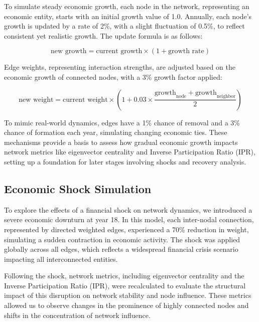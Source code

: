 \documentclass{article} %
\begin{document}
To simulate steady economic growth, each node in the network, representing an economic entity, starts with an initial growth value of 1.0. Annually, each node’s growth is updated by a rate of 2\%, with a slight fluctuation of 0.5\%, to reflect consistent yet realistic growth. The update formula is as follows:

\begin{equation}
\text{new growth} = \text{current growth} \times (1 + \text{growth rate})
\end{equation}

Edge weights, representing interaction strengths, are adjusted based on the economic growth of connected nodes, with a 3\% growth factor applied:

\begin{equation}
\text{new weight} = \text{current weight} \times \left(1 + 0.03 \times \frac{\text{growth}_{\text{node}} + \text{growth}_{\text{neighbor}}}{2}\right)
\end{equation}

To mimic real-world dynamics, edges have a 1\% chance of removal and a 3\% chance of formation each year, simulating changing economic ties. These mechanisms provide a basis to assess how gradual economic growth impacts network metrics like eigenvector centrality and Inverse Participation Ratio (IPR), setting up a foundation for later stages involving shocks and recovery analysis.



\subsection{Economic Shock Simulation}

To explore the effects of a financial shock on network dynamics, we introduced a severe economic downturn at year 18. In this model, each inter-nodal connection, represented by directed weighted edges, experienced a 70\% reduction in weight, simulating a sudden contraction in economic activity. The shock was applied globally across all edges, which reflects a widespread financial crisis scenario impacting all interconnected entities.

Following the shock, network metrics, including eigenvector centrality and the Inverse Participation Ratio (IPR), were recalculated to evaluate the structural impact of this disruption on network stability and node influence. These metrics allowed us to observe changes in the prominence of highly connected nodes and shifts in the concentration of network influence.
\end{document}
